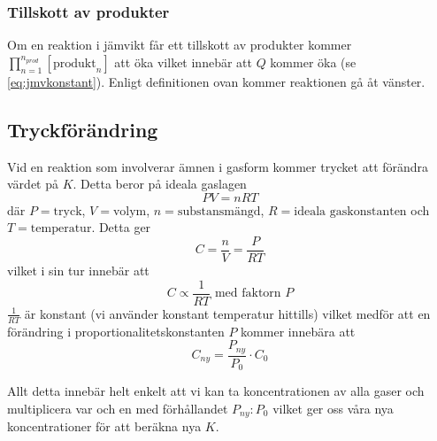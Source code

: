 \subsubsection[Produkter]{Tillskott av produkter}
Om en reaktion i jämvikt får ett tillskott av produkter kommer $\prod^{n_{prod}}_{n=1}[\mathrm{produkt}_n]$ att öka vilket innebär att $Q$ kommer öka (se \cref{eq:jmvkonstant}). Enligt definitionen ovan kommer reaktionen gå åt vänster.

\subsection{Tryckförändring}

Vid en reaktion som involverar ämnen i gasform kommer trycket att förändra värdet på $K$. Detta beror på ideala gaslagen
\begin{equation*}
    PV = nRT
\end{equation*}
där $P = \text{tryck}$, $V = \text{volym}$, $n = \text{substansmängd}$, $R = \text{ideala gaskonstanten}$ och $T = \text{temperatur}$. Detta ger
\begin{equation*}
    C = \frac{n}{V} = \frac{P}{RT}
\end{equation*}
vilket i sin tur innebär att
\begin{equation*}
    C \propto \frac{1}{RT} \text{ med faktorn } P
\end{equation*}
$\frac{1}{RT}$ är konstant (vi använder konstant temperatur hittills) vilket medför att en förändring i proportionalitetskonstanten $P$ kommer innebära att
\begin{equation*}
    C_{ny} = \frac{P_{ny}}{P_0} \cdot C_0
\end{equation*}

Allt detta innebär helt enkelt att vi kan ta koncentrationen av alla gaser och multiplicera var och en med förhållandet $P_{ny}:P_0$ vilket ger oss våra nya koncentrationer för att beräkna nya $K$.

